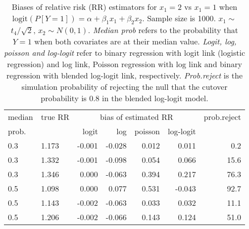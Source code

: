 \documentclass[12pt,a4paper]{article}
\begin{document}
\begin{table}[H] 
\small\sf\centering 
\caption{Biases of relative risk (RR) estimators for $x_1=2$ vs $x_1=1$ when $\mbox{logit}(P[Y=1])=\alpha+\beta_1 x_1 + \beta_2 x_2$. Sample size is 1000. $x_1 \sim $$t_4/\sqrt{2}$, $x_2 \sim N(0,1)$. {\it Median prob} refers to the probability that $Y=1$ when both covariates are at their median value. {\it Logit, log, poisson and log-logit} refer to binary regression with logit link (logistic regression) and log link, Poisson regression with log link and binary regression with blended log-logit link, respectively. {\it Prob.reject} is the simulation probability of rejecting the null that the cutover probability is $0.8$ in the blended log-logit model.} 
\begin{tabular}{llrrrrr} 
\toprule 
median & true RR & \multicolumn{4}{c}{bias of estimated RR} & prob.reject \\ 
prob. & & logit & log & poisson & log-logit  & \\ \midrule 
0.3 & 1.173 & -0.001 & -0.028 & 0.012 &  0.011 &  0.2 \\  
0.3 & 1.332 & -0.001 & -0.098 & 0.054 &  0.066 & 15.6 \\  
0.3 & 1.346 &  0.000 & -0.063 & 0.394 &  0.217 & 76.3 \\  
0.5 & 1.098 &  0.000 &  0.077 & 0.531 & -0.043 & 92.7 \\  
0.5 & 1.143 & -0.002 & -0.063 & 0.033 &  0.032 & 11.1 \\  
0.5 & 1.206 & -0.002 & -0.066 & 0.143 &  0.124 & 51.0 \\  
\bottomrule 
\end{tabular} 
\end{table} 
\end{document}

